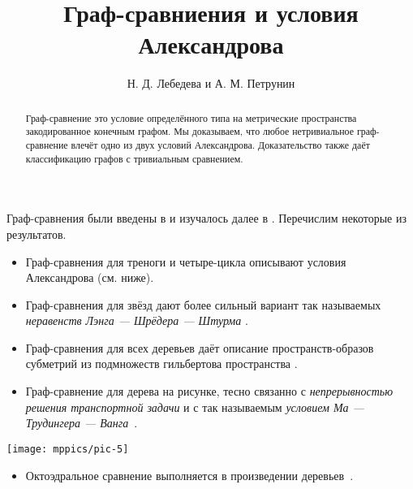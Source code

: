 \documentclass{article}
\def\thetitle{Граф-сравниения и условия Александрова}
\def\theauthors{Н. Д. Лебедева и А. М. Петрунин}
\def\parbf#1{\medskip\noindent{\bf #1}}
\begin{document}
\title{\thetitle}
\author{\theauthors}

\date{}
\maketitle
\begin{abstract}
Граф-сравнение это условие определённого типа на метрические пространства закодированное конечным графом.
Мы доказываем, что любое нетривиальное граф-сравнение влечёт одно из двух условий Александрова.
Доказательство также даёт классификацию графов с тривиальным сравнением.
\end{abstract}

\parbf{Предисловие.}
Граф-сравнения были введены в \cite{lebedeva-petrunin-zolotov} и изучалось далее в \cite{toyoda,toyoda2019,lebedeva-petrunin-CBB,lebedeva,lebedeva-petrunin,lebedeva-petrunin-octahedron}.
Перечислим некоторые из результатов.
\begin{itemize}
\item Граф-сравнения для треноги и четыре-цикла описывают условия Александрова (см. ниже).
\end{itemize}
\begin{itemize}
\item Граф-сравнения для звёзд дают более сильный вариант так называемых \emph{неравенств Лэнга --- Шрёдера --- Штурма} \cite{lang-schroeder, sturm, lebedeva-petrunin-CBB}.
\end{itemize}
\begin{itemize}
\item Граф-сравнения для всех деревьев даёт описание пространств-образов субметрий из подмножеств гильбертова пространства \cite{lebedeva-petrunin-zolotov}.
\end{itemize}

\noindent
\begin{minipage}
{.80\textwidth}
\begin{itemize}
\item Граф-сравнение для дерева на рисунке, тесно связанно с \emph{непрерывностью решения транспортной задачи} и с так называемым \emph{условием Ма --- Трудингера --- Ванга}~\cite{lebedeva-petrunin-zolotov,ma-trudinger-wang}.
\end{itemize}
\end{minipage}
\hfill
\begin{minipage}{.17\textwidth}
\centering
\vskip-1mm
\texttt{[image: mppics/pic-5]}
\end{minipage}
\begin{itemize}
\item Октоэдральное сравнение выполняется в произведении деревьев~\cite{lebedeva-petrunin-octahedron}.
\end{itemize}
\end{document}
